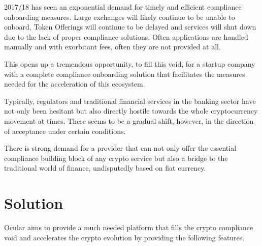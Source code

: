 \documentclass[a4paper]{article}
\begin{document}
2017/18 has seen an exponential demand for timely and efficient compliance onboarding measures.  Large exchanges will likely continue to be unable to onboard, Token Offerings will continue to be delayed and services will shut down due to the lack of proper compliance solutions. Often applications are handled manually and with exorbitant fees, often they are not provided at all.  

This opens up a tremendous opportunity, to fill this void, for a startup company with a complete compliance onboarding solution that facilitates the measures needed for the acceleration of this ecosystem. 

Typically, regulators and traditional financial services in the banking sector have not only been hesitant but also directly hostile towards the whole cryptocurrency movement at times. There seems to be a gradual shift, however, in the direction of acceptance under certain conditions. 

There is strong demand for a provider that can not only offer the essential compliance building block of any crypto service but also a bridge to the traditional world of finance, undisputedly based on fiat currency.  

\clearpage
\section{Solution}
Ocular aims to provide a much needed platform that fills the crypto compliance void and accelerates the crypto evolution by providing the following features. 
\end{document}

